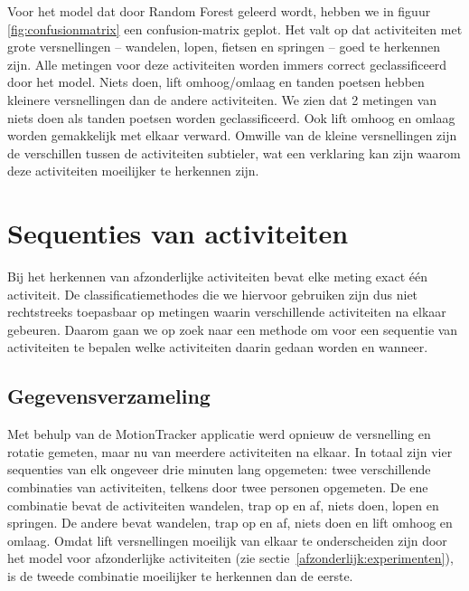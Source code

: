 \documentclass{article}
\begin{document}
Voor het model dat door Random Forest geleerd wordt, hebben we in figuur \ref{fig:confusionmatrix} een confusion-matrix geplot. Het valt op dat activiteiten met grote versnellingen -- wandelen, lopen, fietsen en springen -- goed te herkennen zijn. Alle metingen voor deze activiteiten worden immers correct geclassificeerd door het model. Niets doen, lift omhoog/omlaag en tanden poetsen hebben kleinere versnellingen dan de andere activiteiten. We zien dat 2 metingen van niets doen als tanden poetsen worden geclassificeerd. Ook lift omhoog en omlaag worden gemakkelijk met elkaar verward. Omwille van de kleine versnellingen zijn de verschillen tussen de activiteiten subtieler, wat een verklaring kan zijn waarom deze activiteiten moeilijker te herkennen zijn.
\section{Sequenties van activiteiten}

Bij het herkennen van afzonderlijke activiteiten bevat elke meting exact \'e\'en activiteit. De classificatiemethodes die we hiervoor gebruiken zijn dus niet rechtstreeks toepasbaar op metingen waarin verschillende activiteiten na elkaar gebeuren. Daarom gaan we op zoek naar een methode om voor een sequentie van activiteiten te bepalen welke activiteiten daarin gedaan worden en wanneer.


\subsection{Gegevensverzameling}

Met behulp van de MotionTracker applicatie werd opnieuw de versnelling en rotatie gemeten, maar nu van meerdere activiteiten na elkaar. In totaal zijn vier sequenties van elk ongeveer drie minuten lang opgemeten: twee verschillende combinaties van activiteiten, telkens door twee personen opgemeten. De ene combinatie bevat de activiteiten wandelen, trap op en af, niets doen, lopen en springen. De andere bevat wandelen, trap op en af, niets doen en lift omhoog en omlaag. Omdat lift versnellingen moeilijk van elkaar te onderscheiden zijn door het model voor afzonderlijke activiteiten (zie sectie~\ref{afzonderlijk:experimenten}), is de tweede combinatie moeilijker te herkennen dan de eerste.

\end{document}

